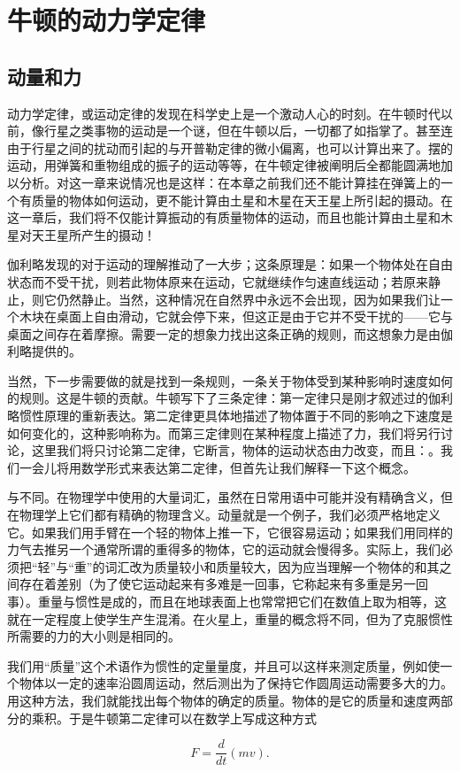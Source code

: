 \documentclass[12pt,oneside]{book}
\providecommand{\ddt}[2]{\frac{d#1}{d#2}}
\begin{document}
\chapter{牛顿的动力学定律}
\section{动量和力}
动力学定律，或运动定律的发现在科学史上是一个激动人心的时刻。在牛顿时代以前，像行星之类事物的运动是一个谜，但在牛顿以后，一切都了如指掌了。甚至连由于行星之间的扰动而引起的与开普勒定律的微小偏离，也可以计算出来了。摆的运动，用弹簧和重物组成的振子的运动等等，在牛顿定律被阐明后全都能圆满地加以分析。对这一章来说情况也是这样：在本章之前我们还不能计算挂在弹簧上的一个有质量的物体如何运动，更不能计算由土星和木星在天王星上所引起的摄动。在这一章后，我们将不仅能计算振动的有质量物体的运动，而且也能计算由土星和木星对天王星所产生的摄动！

伽利略发现的对于运动的理解推动了一大步；这条原理是：如果一个物体处在自由状态而不受干扰，则若此物体原来在运动，它就继续作匀速直线运动；若原来静止，则它仍然静止。当然，这种情况在自然界中永远不会出现，因为如果我们让一个木块在桌面上自由滑动，它就会停下来，但这正是由于它并不受干扰的——它与桌面之间存在着摩擦。需要一定的想象力找出这条正确的规则，而这想象力是由伽利略提供的。

当然，下一步需要做的就是找到一条规则，一条关于物体受到某种影响时速度如何的规则。这是牛顿的贡献。牛顿写下了三条定律：第一定律只是刚才叙述过的伽利略惯性原理的重新表达。第二定律更具体地描述了物体置于不同的影响之下速度是如何变化的，这种影响称为。而第三定律则在某种程度上描述了力，我们将另行讨论，这里我们将只讨论第二定律，它断言，物体的运动状态由力改变，而且：。我们一会儿将用数学形式来表达第二定律，但首先让我们解释一下这个概念。

与不同。在物理学中使用的大量词汇，虽然在日常用语中可能并没有精确含义，但在物理学上它们都有精确的物理含义。动量就是一个例子，我们必须严格地定义它。如果我们用手臂在一个轻的物体上推一下，它很容易运动；如果我们用同样的力气去推另一个通常所谓的重得多的物体，它的运动就会慢得多。实际上，我们必须把“轻”与“重”的词汇改为质量较小和质量较大，因为应当理解一个物体的和其之间存在着差别（为了使它运动起来有多难是一回事，它称起来有多重是另一回事）。重量与惯性是成的，而且在地球表面上也常常把它们在数值上取为相等，这就在一定程度上使学生产生混淆。在火星上，重量的概念将不同，但为了克服惯性所需要的力的大小则是相同的。

我们用“质量”这个术语作为惯性的定量量度，并且可以这样来测定质量，例如使一个物体以一定的速率沿圆周运动，然后测出为了保持它作圆周运动需要多大的力。用这种方法，我们就能找出每个物体的确定的质量。物体的是它的质量和速度两部分的乘积。于是牛顿第二定律可以在数学上写成这种方式

\begin{equation}
\label{Eq:I:9:1}
F=\ddt{}{t}(mv).
\end{equation}
\end{document}
